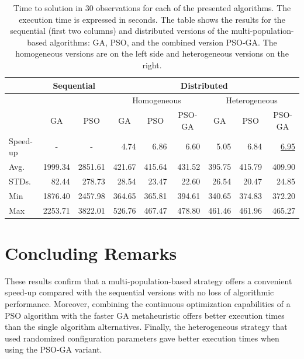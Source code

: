 \documentclass[runningheads]{llncs}
\begin{document}
\begin{table}[]
\caption{
  Time to solution in 30 observations for each of the
    presented algorithms. The execution time is expressed in seconds. The table
    shows the results for the sequential (first two columns) and distributed
    versions of the multi-population-based algorithms: GA, PSO, and the combined
    version PSO-GA. The homogeneous versions are on the left side and
    heterogeneous versions on the right.
    }\label{tab:speedup}
\renewcommand*{\arraystretch}{1.4}
\setlength{\tabcolsep}{5pt}
    \begin{small}
\begin{tabular}{lrrrrrrrr}
    \hline
				&  \multicolumn{2}{c}{Sequential} & \multicolumn{6}{c}{Distributed} \\
    \hline
    & &    & \multicolumn{3}{c}{Homogeneous} & \multicolumn{3}{c}{Heterogeneous} \\
    \cline{4-6} \cline{7-9}
       & \multicolumn{1}{c}{GA} & \multicolumn{1}{c}{PSO} &\multicolumn{1}{c}{GA} & \multicolumn{1}{c}{PSO} & \multicolumn{1}{c}{PSO-GA} &\multicolumn{1}{c}{GA} & \multicolumn{1}{c}{PSO} & \multicolumn{1}{c}{PSO-GA}\\
    \hline
    Speed-up & \multicolumn{1}{c}{-} & \multicolumn{1}{c}{-} & 4.74 & 6.86 & 6.60 & 5.05 & 6.84 & \underline{6.95} \\
    \hline
Avg.   & 1999.34 & 2851.61 & 421.67 & 415.64 & 431.52 & 395.75 & 415.79 & 409.90 \\
    \hline
STDs.   & 82.44   & 278.73  & 28.54           & 23.47                    & 22.60           & 26.54           & 20.47           & 24.85    \\
    \hline
Min    & 1876.40 & 2457.98 & 364.65          & 365.81                   & 394.61          & 340.65          & 374.83          & 372.20   \\
    \hline
Max    & 2253.71 & 3822.01 & 526.76          & 467.47                   & 478.80          & 461.46          & 461.96          & 465.27  \\
    \hline
\end{tabular}
    \end{small}
\end{table}

\section{Concluding Remarks}

These results confirm that a multi-population-based strategy offers a convenient
speed-up compared with the sequential versions with no loss of algorithmic
performance.  Moreover, combining the continuous optimization capabilities of a
PSO algorithm with the faster GA metaheuristic offers better execution times
than the single algorithm alternatives.  Finally, the heterogeneous strategy
that used randomized configuration parameters gave better execution times when
using the PSO-GA variant.
\end{document}
